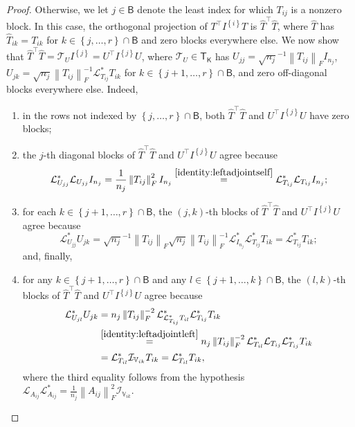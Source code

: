 \documentclass[oneside]{amsart}
\theoremstyle{plain}
\theoremstyle{definition}
\theoremstyle{remark}
\numberwithin{equation}{section}
\begin{document}
\begin{proof}
Otherwise, we let $j \in \mathsf{B}$ denote the least index for which
$T_{ij}$ is a nonzero block. In this case, the orthogonal projection of
$T^{\top} I^{\left\{i\right\}} T$ is $\hat{T}^{\top} \hat{T}$, where
$\hat{T}$ has $\hat{T}_{ik} = T_{ik}$ for $k \in \left\{j, \dotsc,
r\right\} \cap \mathsf{B}$ and zero blocks everywhere else. We now show
that $\hat{T}^{\top} \hat{T} = \mathcal{T}_{U} I^{\left\{j\right\}} =
U^{\top} I^{\left\{j\right\}} U$, where $\mathcal{T}_{U} \in
\mathsf{T}_{\mathsf{K}}$ has $U_{jj} = \sqrt{n_{j}}^{-1} \left\lVert
T_{ij}\right\rVert_{F} I_{n_{j}}$, $U_{jk} = \sqrt{n_{j}} \left\lVert
T_{ij}\right\rVert_{F}^{-1} \mathcal{L}^{*}_{T_{ij}} T_{ik}$ for $k \in
\left\{j+1, \dotsc, r\right\} \cap \mathsf{B}$, and zero off-diagonal
blocks everywhere else. Indeed,
\begin{enumerate}[label=(\roman*)]
\item in the rows not indexed by $\left\{j, \dotsc, r\right\} \cap
\mathsf{B}$, both $\hat{T}^{\top} \hat{T}$ and $U^{\top}
I^{\left\{j\right\}} U$ have zero blocks;

\item the $j$-th diagonal blocks of $\hat{T}^{\top} \hat{T}$ and $U^{\top}
I^{\left\{j\right\}} U$ agree because
\[
\mathcal{L}^{*}_{U_{jj}} \mathcal{L}_{U_{jj}} I_{n_{j}} =
\frac{1}{n_{j}}\left\lVert T_{ij}\right\rVert_{F}^{2} I_{n_{j}}
\overset{\ref{identity:leftadjointself}}{=} \mathcal{L}^{*}_{T_{ij}}
\mathcal{L}_{T_{ij}} I_{n_{j}};
\]

\item for each $k \in \left\{j+1, \dotsc, r\right\} \cap \mathsf{B}$, the
$(j, k)$-th blocks of $\hat{T}^{\top} \hat{T}$ and $U^{\top}
I^{\left\{j\right\}} U$ agree because
\[
\mathcal{L}^{*}_{U_{jj}} U_{jk} = \sqrt{n_{j}}^{-1} \left\lVert
T_{ij}\right\rVert_{F} \sqrt{n_{j}} \left\lVert T_{ij}\right\rVert_{F}^{-1}
\mathcal{L}^{*}_{I_{n_{j}}} \mathcal{L}^{*}_{T_{ij}} T_{ik} =
\mathcal{L}^{*}_{T_{ij}} T_{ik};
\]
and, finally,

\item for any $k \in \left\{j+1, \dotsc, r\right\} \cap \mathsf{B}$ and any
$l \in \left\{j+1, \dotsc, k\right\} \cap \mathsf{B}$, the $(l, k)$-th
blocks of $\hat{T}^{\top} \hat{T}$ and $U^{\top} I^{\left\{j\right\}} U$
agree because
\[
\begin{split}
\mathcal{L}^{*}_{U_{jl}} U_{jk}
%
&= n_{j} \left\lVert T_{ij}\right\rVert_{F}^{-2}
\mathcal{L}^{*}_{\mathcal{L}^{*}_{T_{ij}} T_{il}} \mathcal{L}^{*}_{T_{ij}}
T_{ik}
\\
&\overset{\ref{identity:leftadjointleft}}{=} n_{j} \left\lVert
T_{ij}\right\rVert_{F}^{-2} \mathcal{L}^{*}_{T_{il}} \mathcal{L}_{T_{ij}}
\mathcal{L}^{*}_{T_{ij}} T_{ik}
\\
&= \mathcal{L}^{*}_{T_{il}} \mathcal{I}_{\mathbb{V}_{ik}} T_{ik}
%
= \mathcal{L}^{*}_{T_{il}} T_{ik},
\end{split}
\]
where the third equality follows from the hypothesis $\mathcal{L}_{A_{ij}}
\mathcal{L}^{*}_{A_{ij}} = \frac{1}{n_{j}} \left\lVert
A_{ij}\right\rVert_{F}^{2} \mathcal{I}_{\mathbb{V}_{ik}}$.


\end{enumerate}
\end{proof}
\end{document}
